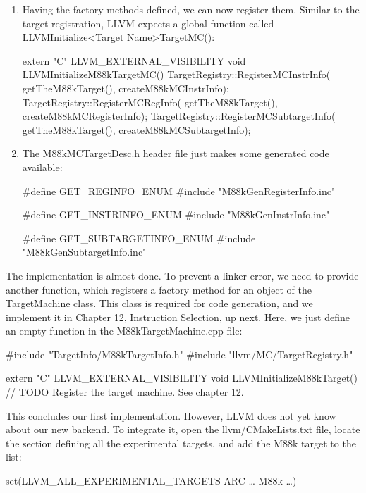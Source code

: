 \begin{enumerate}
\item
Having the factory methods defined, we can now register them. Similar to the target registration, LLVM expects a global function called LLVMInitialize<Target Name>TargetMC():

\begin{cpp}
extern "C" LLVM_EXTERNAL_VISIBILITY void
LLVMInitializeM88kTargetMC() {
    TargetRegistry::RegisterMCInstrInfo(
        getTheM88kTarget(), createM88kMCInstrInfo);
    TargetRegistry::RegisterMCRegInfo(
        getTheM88kTarget(), createM88kMCRegisterInfo);
    TargetRegistry::RegisterMCSubtargetInfo(
        getTheM88kTarget(), createM88kMCSubtargetInfo);
}
\end{cpp}

\item
The M88kMCTargetDesc.h header file just makes some generated code available:

\begin{cpp}
#define GET_REGINFO_ENUM
#include "M88kGenRegisterInfo.inc"

#define GET_INSTRINFO_ENUM
#include "M88kGenInstrInfo.inc"

#define GET_SUBTARGETINFO_ENUM
#include "M88kGenSubtargetInfo.inc"
\end{cpp}
\end{enumerate}

The implementation is almost done. To prevent a linker error, we need to provide another function, which registers a factory method for an object of the TargetMachine class. This class is required for code generation, and we implement it in Chapter 12, Instruction Selection, up next. Here, we just define an empty function in the M88kTargetMachine.cpp file:

\begin{cpp}
#include "TargetInfo/M88kTargetInfo.h"
#include "llvm/MC/TargetRegistry.h"

extern "C" LLVM_EXTERNAL_VISIBILITY void
LLVMInitializeM88kTarget() {
    // TODO Register the target machine. See chapter 12.
}
\end{cpp}

This concludes our first implementation. However, LLVM does not yet know about our new backend. To integrate it, open the llvm/CMakeLists.txt file, locate the section defining all the experimental targets, and add the M88k target to the list:

\begin{cmake}
set(LLVM_ALL_EXPERIMENTAL_TARGETS ARC … M88k …)
\end{cmake}

